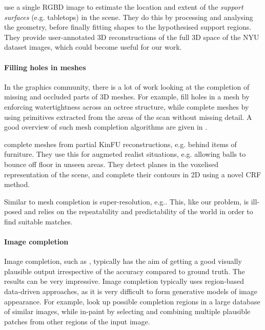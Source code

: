 \documentclass[10pt,twocolumn,letterpaper]{article}
\makeatletter
\renewcommand*{\eg}{e.g.\@\xspace}
\newcommand*{\ea}{et al.\@\xspace}
\makeatother
\begin{document}

\cite{guo-iccv-2013} use a single RGBD image to estimate the location and extent of the \emph{support surfaces} (\eg tabletops) in the scene. They do this by processing and analysing the geometry, before finally fitting shapes to the hypothesised support regions. They provide user-annotated 3D reconstructions of the full 3D space of the NYU dataset images, which could become useful for our work.

\paragraph{Filling holes in meshes}
In the graphics community, there is a lot of work looking at the completion of missing and occluded parts of 3D meshes. 
For example, \cite{podolak-esgp-2005} fill holes in a mesh by enforcing watertightness across an octree structure, while \cite{schnabel-eurographics-2009} complete meshes by using primitives extracted from the areas of the scan without missing detail. 
A good overview of such mesh completion algorithms are given in \cite{ju-cst-2009}.

\cite{silberman-eccv-2014} complete meshes from partial KinFU reconstructions, \eg behind items of furniture.
They use this for augmeted realist situations, \eg allowing balls to bounce off floor in unseen areas.
They detect planes in the voxelised representation of the scene, and complete their contours in 2D using a novel CRF method.

Similar to mesh completion is super-resolution, \eg \cite{macaodha-eccv-2012}. 
This, like our problem, is ill-posed and relies on the repeatability and predictability of the world in order to find suitable matches.

\paragraph{Image completion}
Image completion, such as \cite{hays-siggraph-2007, criminisi-cvpr-2003}, typically has the aim of getting a good visually plausible output irrespective of the accuracy compared to ground truth. 
The results can be very impressive.
Image completion typically uses region-based data-driven approaches, as it is very difficult to form generative models of image appearance.
For example, \cite{hays-siggraph-2007} look up possible completion regions in a large database of similar images, while \cite{criminisi-cvpr-2003} in-paint by selecting and combining multiple plausible patches from other regions of the input image.
\end{document}
